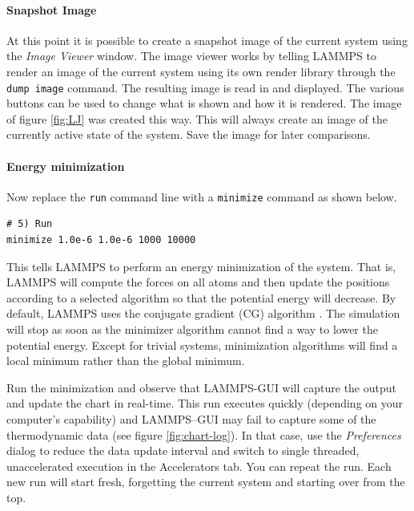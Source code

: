 \documentclass[9pt,tutorial]{livecoms}
\newcommand{\lmpcmd}[1]{\hspace{0pt}\colorbox{listing}{\textcolor{command}{\texttt{#1}}}\hspace{0pt}} %
\begin{document}
\paragraph{Snapshot Image}

At this point it is possible to create a snapshot image of the
current system using the \textit{Image Viewer} window.  The image viewer
works by telling LAMMPS to render an image of the current system using
its own render library through the \lmpcmd{dump image} command.  The
resulting image is read in and displayed.  The various buttons can be
used to change what is shown and how it is rendered.  The image of
figure \ref{fig:LJ} was created this way.  This will always create an
image of the currently active state of the system.  Save the image for
later comparisons.

\paragraph{Energy minimization}
Now replace the \lmpcmd{run} command line with a \lmpcmd{minimize} command
as shown below.
\begin{lstlisting}
# 5) Run
minimize 1.0e-6 1.0e-6 1000 10000
\end{lstlisting}

This tells LAMMPS to perform an energy minimization of the system.  That
is, LAMMPS will compute the forces on all atoms and then update the
positions according to a selected algorithm so that the potential energy
will decrease.  By default, LAMMPS uses the conjugate gradient (CG)
algorithm \cite{hestenes1952methods}.  The simulation will stop as soon
as the minimizer algorithm cannot find a way to lower the potential
energy.  Except for trivial systems, minimization algorithms will find a
local minimum rather than the global minimum.

Run the minimization and observe that LAMMPS-GUI will capture the output
and update the chart in real-time.  This run executes quickly (depending
on your computer's capability) and LAMMPS--GUI may fail to capture some
of the thermodynamic data (see figure \ref{fig:chart-log}).  In that
case, use the \textit{Preferences} dialog to reduce the data update
interval and switch to single threaded, unaccelerated execution in the
Accelerators tab.  You can repeat the run.  Each new run will start
fresh, forgetting the current system and starting over from the top.
\end{document}
